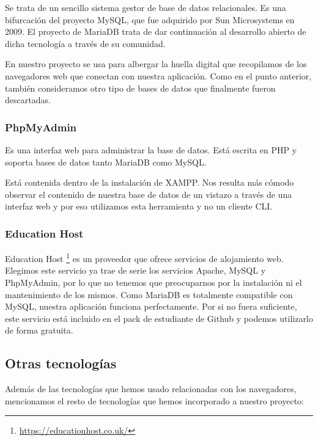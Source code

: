 Se trata de un sencillo sistema gestor de base de datos relacionales. Es una bifurcación del proyecto MySQL, que fue adquirido por Sun Microsystems en 2009. El proyecto de MariaDB trata de dar continuación al desarrollo abierto de dicha tecnología a través de su comunidad. \par 

En nuestro proyecto se usa para albergar la huella digital que recopilamos de los navegadores web que conectan con nuestra aplicación. Como en el punto anterior, también consideramos otro tipo de bases de datos que finalmente fueron descartadas. \par 

\subsubsection{PhpMyAdmin}

Es una interfaz web para administrar la base de datos. Está escrita en PHP y soporta bases de datos tanto MariaDB como MySQL. \par 

Está contenida dentro de la instalación de XAMPP. Nos resulta más cómodo observar el contenido de nuestra base de datos de un vistazo a través de una interfaz web y por eso utilizamos esta herramienta y no un cliente CLI. \par

\subsubsection{Education Host}

Education Host \footnote{\url{https://educationhost.co.uk/}} es un proveedor que ofrece servicios de alojamiento web. Elegimos este servicio ya trae de serie los servicios Apache, MySQL y PhpMyAdmin, por lo que no tenemos que preocuparnos por la instalación ni el mantenimiento de los mismos. Como MariaDB es totalmente compatible con MySQL, nuestra aplicación funciona perfectamente. Por si no fuera suficiente, este servicio está incluido en el pack de estudiante de Github y podemos utilizarlo de forma gratuita.

\subsection{Otras tecnologías}

Además de las tecnologías que hemos usado relacionadas con los navegadores, mencionamos el resto de tecnologías que hemos incorporado a nuestro proyecto: \par 

